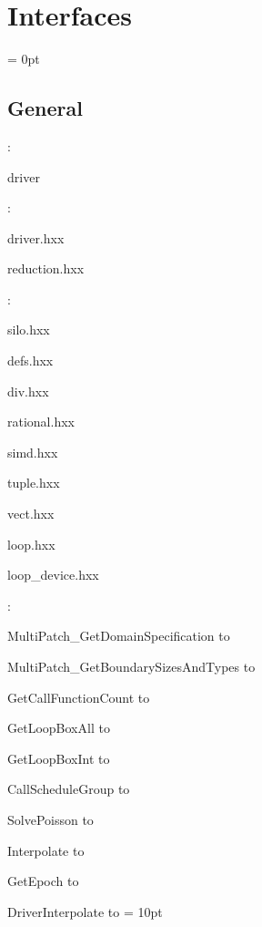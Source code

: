 
\section{Interfaces} 


\parskip = 0pt

\vspace{3mm} \subsection*{General}

: 

driver
\vspace{2mm}

\vspace{5mm}

: 



driver.hxx

reduction.hxx
\vspace{2mm}

: 

silo.hxx

defs.hxx

div.hxx

rational.hxx

simd.hxx

tuple.hxx

vect.hxx

loop.hxx

loop\_device.hxx
\vspace{2mm}

: 



MultiPatch\_GetDomainSpecification to 

MultiPatch\_GetBoundarySizesAndTypes to 

GetCallFunctionCount to 

GetLoopBoxAll to 

GetLoopBoxInt to 

CallScheduleGroup to 

SolvePoisson to 

Interpolate to 

GetEpoch to 

DriverInterpolate to 
\vspace{2mm}\parskip = 10pt 
